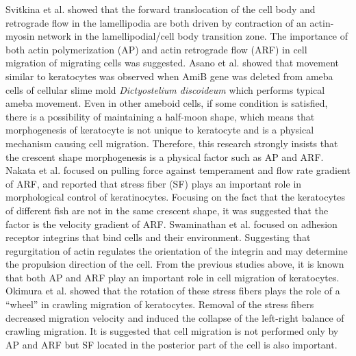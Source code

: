 \documentclass[a4paper,12pt]{book}
\begin{document}
Svitkina et al. \cite{svitkina1997analysis} showed that the forward translocation of the cell body and retrograde flow in the lamellipodia are both driven by contraction of an actin-myosin network in the lamellipodial/cell body transition zone.
The importance of both actin polymerization (AP) and actin retrograde flow (ARF) in cell migration of migrating cells was suggested.
Asano et al. \cite{asano2004keratocyte} showed that movement similar to keratocytes was observed when AmiB gene was deleted from ameba cells of cellular slime mold {\it Dictyostelium discoideum} which performs typical ameba movement.
Even in other ameboid cells, if some condition is satisfied, there is a possibility of maintaining a half-moon shape, which means that morphogenesis of keratocyte is not unique to keratocyte and is a physical mechanism causing cell migration.
Therefore, this research strongly insists that the crescent shape morphogenesis is a physical factor such as AP and ARF.
Nakata et al. \cite{nakata2016role} focused on pulling force against temperament and flow rate gradient of ARF, and reported that stress fiber (SF) plays an important role in morphological control of keratinocytes.
Focusing on the fact that the keratocytes of different fish are not in the same crescent shape, it was suggested that the factor is the velocity gradient of ARF.
Swaminathan et al. \cite{swaminathan2017actin} focused on adhesion receptor integrins that bind cells and their environment.
Suggesting that regurgitation of actin regulates the orientation of the integrin and may determine the propulsion direction of the cell. From the previous studies above, it is known that both AP and ARF play an important role in cell migration of keratocytes.
Okimura et al. \cite{okimura2018rotation} showed that the rotation of these stress fibers plays the role of a “wheel” in crawling migration of keratocytes.
Removal of the stress fibers decreased migration velocity and induced the collapse of the left-right balance of crawling migration.
It is suggested that cell migration is not performed only by AP and ARF but SF located in the posterior part of the cell is also important.
\end{document}
